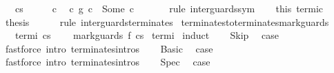 \begin{isabellebody}
\ \ \ {\isachardoublequoteopen}{\isasymGamma}{\isasymturnstile}c{\isasymdown}s{\isachardoublequoteclose}\isanewline
%
\isadelimproof
%
\endisadelimproof
%
\isatagproof
{}\isamarkupfalse%
\ {\isacharminus}\isanewline
\ \ \isamarkupfalse%
\ c\ \isamarkupfalse%
\ {\isachardoublequoteopen}{\isacharparenleft}c{}\ {\isasyminter}\isactrlsub g\ c{}{\isacharparenright}\ {\isacharequal}\ Some\ c{\isachardoublequoteclose}\ \isanewline
\ \ \ \ \isamarkupfalse%
\ {\isacharparenleft}rule\ inter{\isacharunderscore}guards{\isacharunderscore}sym{\isacharparenright}\isanewline
\ \ \isamarkupfalse%
\ this\ termi{\isacharunderscore}c{}\ \isamarkupfalse%
\ {\isacharquery}thesis\isanewline
\ \ \ \ \isamarkupfalse%
\ {\isacharparenleft}rule\ inter{\isacharunderscore}guards{\isacharunderscore}terminates{\isacharparenright}\isanewline
{}\isamarkupfalse%
%
\endisatagproof
{\isafoldproof}%
%
\isadelimproof
%
\endisadelimproof
%
\isamarkuptrue%
\isamarkupfalse%
\ terminates{\isacharunderscore}to{\isacharunderscore}terminates{\isacharunderscore}mark{\isacharunderscore}guards{\isacharcolon}\isanewline
\ \ \ termi{\isacharcolon}\ {\isachardoublequoteopen}{\isasymGamma}{\isasymturnstile}c{\isasymdown}s{\isachardoublequoteclose}\ \isanewline
\ \ \ {\isachardoublequoteopen}{\isasymGamma}{\isasymturnstile}mark{\isacharunderscore}guards\ f\ c{\isasymdown}s{\isachardoublequoteclose}\isanewline
%
\isadelimproof
%
\endisadelimproof
%
\isatagproof
{}\isamarkupfalse%
\ termi\isanewline
{}\isamarkupfalse%
\ {\isacharparenleft}induct{\isacharparenright}\isanewline
\ \ \isamarkupfalse%
\ Skip\ \isamarkupfalse%
\ {\isacharquery}case\ \isamarkupfalse%
\ {\isacharparenleft}fastforce\ intro{\isacharcolon}\ terminates{\isachardot}intros{\isacharparenright}\isanewline
{}\isamarkupfalse%
\isanewline
\ \ \isamarkupfalse%
\ Basic\ \isamarkupfalse%
\ {\isacharquery}case\ \isamarkupfalse%
\ {\isacharparenleft}fastforce\ intro{\isacharcolon}\ terminates{\isachardot}intros{\isacharparenright}\isanewline
{}\isamarkupfalse%
\isanewline
\ \ \isamarkupfalse%
\ Spec\ \isamarkupfalse%
\ {\isacharquery}case\ \isamarkupfalse%

\end{isabellebody}
